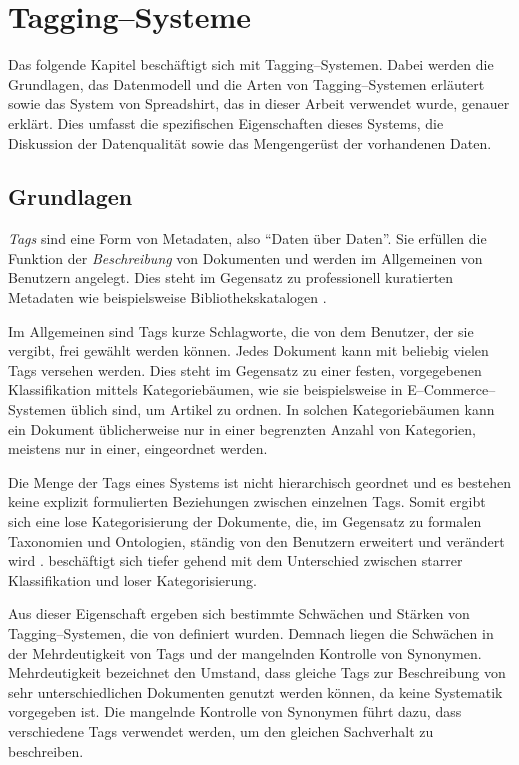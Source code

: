 \chapter{Tagging--Systeme}
\label{tagging}

Das folgende Kapitel beschäftigt sich mit Tagging--Systemen. Dabei werden die Grundlagen, das Datenmodell und die Arten von Tagging--Systemen erläutert sowie das System von Spreadshirt, das in dieser Arbeit verwendet wurde, genauer erklärt. Dies umfasst die spezifischen Eigenschaften dieses Systems, die Diskussion der Datenqualität sowie das Mengengerüst der vorhandenen Daten.

\section{Grundlagen}
\label{tagging_basics}

\emph{Tags} sind eine Form von Metadaten, also ``Daten über Daten''. Sie erfüllen die Funktion der \emph{Beschreibung} von Dokumenten und werden im Allgemeinen von Benutzern angelegt. Dies steht im Gegensatz zu professionell kuratierten Metadaten wie beispielsweise Bibliothekskatalogen \cite{ma2004}.

Im Allgemeinen sind Tags kurze Schlagworte, die von dem Benutzer, der sie vergibt, frei gewählt werden können. Jedes Dokument kann mit beliebig vielen Tags versehen werden. Dies steht im Gegensatz zu einer festen, vorgegebenen Klassifikation mittels Kategoriebäumen, wie sie beispielsweise in E--Commerce--Systemen üblich sind, um Artikel zu ordnen. In solchen Kategoriebäumen kann ein Dokument üblicherweise nur in einer begrenzten Anzahl von Kategorien, meistens nur in einer, eingeordnet werden.

Die Menge der Tags eines Systems ist nicht hierarchisch geordnet und es bestehen keine explizit formulierten Beziehungen zwischen einzelnen Tags. Somit ergibt sich eine lose Kategorisierung der Dokumente, die, im Gegensatz zu formalen Taxonomien und Ontologien, ständig von den Benutzern erweitert und verändert wird \cite{sc2005}. \textcite{je2004} beschäftigt sich tiefer gehend mit dem Unterschied zwischen starrer Klassifikation und loser Kategorisierung.

Aus dieser Eigenschaft ergeben sich bestimmte Schwächen und Stärken von Tagging--Systemen, die von \textcite{ma2004} definiert wurden. Demnach liegen die Schwächen in der Mehrdeutigkeit von Tags und der mangelnden Kontrolle von Synonymen. Mehrdeutigkeit bezeichnet den Umstand, dass gleiche Tags zur Beschreibung von sehr unterschiedlichen Dokumenten genutzt werden können, da keine Systematik vorgegeben ist. Die mangelnde Kontrolle von Synonymen führt dazu, dass verschiedene Tags verwendet werden, um den gleichen Sachverhalt zu beschreiben.

